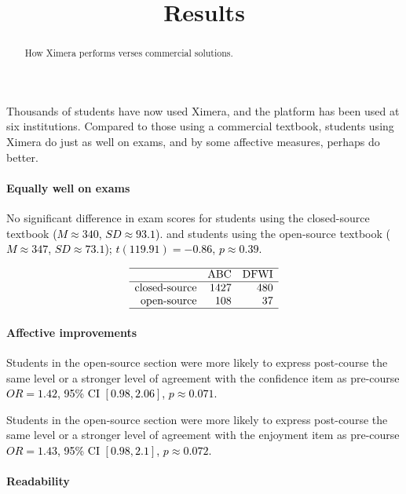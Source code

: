 \documentclass{ximera}
\title{Results}
\begin{document}
\begin{abstract}
  How Ximera performs verses commercial solutions.
\end{abstract}
\maketitle

Thousands of students have now used Ximera, and the platform has been
used at six institutions.  Compared to those using a commercial
textbook, students using Ximera do just as well on exams, and by some
affective measures, perhaps do better.

\paragraph{Equally well on exams}
    
No significant difference in exam scores for students using the
closed-source textbook \textcolor{black}{(\(M \approx 340\),
  \(SD \approx 93.1\))}.  and students using the open-source textbook
\textcolor{black}{(\(M \approx 347\), \(SD \approx 73.1\));}
\textcolor{black}{\(t( 119.91 ) = -0.86\), \(p\approx 0.39\).}



\[
  \begin{array}{rrr}
    \hline
    & \text{ABC} & \text{DFWI} \\ 
    \hline
    \text{closed-source} & 1427 & 480 \\ 
    \text{open-source} & 108 &  37 \\ 
    \hline
  \end{array}
\]

\paragraph{Affective improvements}

Students in the open-source section were more likely to express
post-course the same level or a stronger level of agreement with the
confidence item as pre-course \textcolor{black}{\(OR = 1.42\), 95\% CI
  \([ 0.98 , 2.06 ]\), \(p\approx 0.071\).}

Students in the open-source section were more likely to express
post-course the same level or a stronger level of agreement with the
enjoyment item as pre-course \textcolor{black}{\(OR = 1.43\), 95\% CI
  \([ 0.98 , 2.1 ]\), \(p\approx 0.072\).}

\paragraph{Readability}
\end{document}
